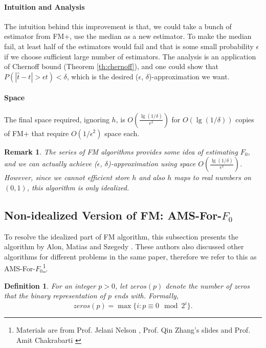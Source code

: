 \documentclass[11pt]{article}
\theoremstyle{plain}
\newtheorem{definition}[theorem]{Definition}
\newtheorem{remark}[theorem]{Remark}
\begin{document}
\paragraph{Intuition and Analysis}
The intuition behind this improvement is that, we could take a bunch of 
estimator from FM+, use the median as a new estimator. To make the median 
fail, at least half of the estimators would fail and that is some small 
probability $\epsilon$ if we choose sufficient large number of estimators. The 
analysis is an application of Chernoff bound (Theorem  \ref{th:chernoff}), 
and one could show that $P(|\widehat{t} - t| > \epsilon t) < \delta$, which is 
the desired ($\epsilon$, $\delta$)-approximation we want. 

\paragraph{Space}
The final space required, ignoring $h$, is $O(\frac{\lg(1/\delta)}{\epsilon^2})$ 
for $O(\lg (1/\delta))$ copies of FM+ that require $O(1/\epsilon^2)$ space 
each.

\begin{remark}
The series of FM algorithms provides some idea of estimating $F_0$, and we 
can actually achieve ($\epsilon$, $\delta$)-approximation using space 
$O(\frac{\lg(1/\delta)}{\epsilon^2})$. However, since we cannot efficient store 
$h$ and also $h$ maps to real numbers on $(0,1)$, this algorithm is only 
idealized.
\end{remark}

\subsection{Non-idealized Version of FM: AMS-For-$F_0$}

To resolve the idealized part of FM algorithm, this subsection presents the 
algorithm by Alon, Matias and Szegedy  \cite{AMS99}. These authors also 
discussed other algorithms for different problems in the same paper, 
therefore we refer to this as AMS-For-$F_0$\footnote{Materials are from 
Prof. Jelani Nelson  \cite{Nel2015-web}, Prof. Qin Zhang's 
slides  \cite{zhang2017-slides} and Prof. Amit 
Chakrabarti  \cite{Cha2015-notes}}.

\begin{definition}
\label{def:zeros}
For an integer $p > 0$, let $zeros(p)$ denote the number of zeros that the 
binary representation of $p$ ends with. Formally,
\[
zeros(p) = \max\{i : p\equiv0\mod 2^i \}.
\]
\end{definition}
\end{document}
